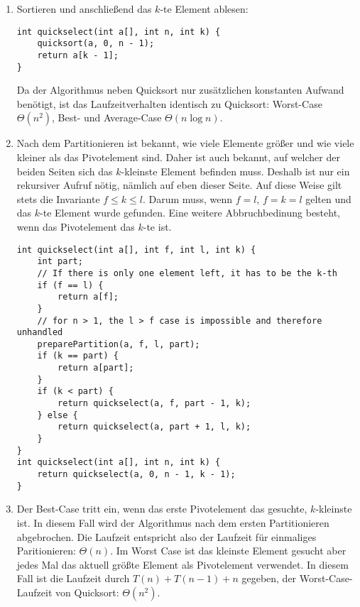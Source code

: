 \documentclass[11pt,a4paper]{article}
\begin{document}
\begin{loesung}
    
    \begin{enumerate}
        \item Sortieren und anschließend das $k$-te Element ablesen:
        \begin{lstlisting}
int quickselect(int a[], int n, int k) {
    quicksort(a, 0, n - 1);
    return a[k - 1];
}
        \end{lstlisting}
        Da der Algorithmus neben Quicksort nur zusätzlichen konstanten Aufwand benötigt, ist das Laufzeitverhalten identisch zu Quicksort: Worst-Case $\Theta(n^2)$, Best- und Average-Case $\Theta(n \log n)$.

        \item
        Nach dem Partitionieren ist bekannt, wie viele Elemente größer und wie viele kleiner als das Pivotelement sind.
        Daher ist auch bekannt, auf welcher der beiden Seiten sich das $k$-kleinste Element befinden muss.
        Deshalb ist nur ein rekursiver Aufruf nötig, nämlich auf eben dieser Seite.
        Auf diese Weise gilt stets die Invariante $f \leq k \leq l$.
        Darum muss, wenn $f = l$, $f = k = l$ gelten und das $k$-te Element wurde gefunden.
        Eine weitere Abbruchbedinung besteht, wenn das Pivotelement das $k$-te ist.
        \begin{lstlisting}
int quickselect(int a[], int f, int l, int k) {
    int part;
    // If there is only one element left, it has to be the k-th
    if (f == l) {
        return a[f];
    }
    // for n > 1, the l > f case is impossible and therefore unhandled
    preparePartition(a, f, l, part);
    if (k == part) {
        return a[part];
    }
    if (k < part) {
        return quickselect(a, f, part - 1, k);
    } else {
        return quickselect(a, part + 1, l, k);
    }
}
int quickselect(int a[], int n, int k) {
    return quickselect(a, 0, n - 1, k - 1);
}
        \end{lstlisting}

        \item
        Der Best-Case tritt ein, wenn das erste Pivotelement das gesuchte, $k$-kleinste ist.
        In diesem Fall wird der Algorithmus nach dem ersten Partitionieren abgebrochen.
        Die Laufzeit entspricht also der Laufzeit für einmaliges Paritionieren: $\Theta(n)$.
        Im Worst Case ist das kleinste Element gesucht aber jedes Mal das aktuell größte Element als Pivotelement verwendet.
        In diesem Fall ist die Laufzeit durch $T(n) + T(n - 1) + n$ gegeben, der Worst-Case-Laufzeit von Quicksort: $\Theta(n^2)$.


\end{enumerate}
\end{loesung}
\end{document}
